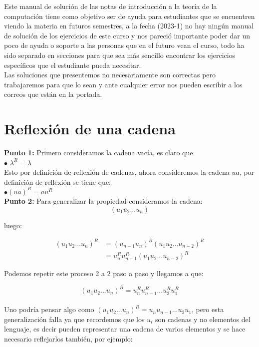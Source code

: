 Este manual de solución de las notas de introducción a la teoría de la computación tiene como objetivo ser de ayuda para estudiantes que se encuentren viendo la materia en futuros semestres, a la fecha (2023-1) no hay ningún manual de solución de los ejercicios de este curso y nos pareció importante poder dar un poco de ayuda o soporte a las personas que en el futuro vean el curso, todo ha sido separado en secciones para que sea más sencillo encontrar los ejercicios específicos que el estudiante pueda necesitar.\\

Las soluciones que presentemos no necesariamente son correctas pero trabajaremos para que lo sean y ante cualquier error nos pueden escribir a los correos que están en la portada.

\section{Reflexión de una cadena}

\textbf{Punto 1:} Primero consideramos la cadena vacía, es claro que \\

\quad $\bullet$ $\lambda^R=\lambda$\\

Esto por definición de reflexión de cadenas, ahora consideremos la cadena $ua$, por definición de reflexión se tiene que:\\

\quad $\bullet (ua)^R=au^R$\\

\textbf{Punto 2:} Para generalizar la propiedad consideramos la cadena:\\

$$(u_1u_2...u_n)$$

luego:

\begin{align*}
(u_1u_2...u_n)^R&=(u_{n-1}u_n)^R(u_1u_2...u_{n-2})^R\\
&=u_n^Ru_{n-1}^R(u_1u_2...u_{n-2})^R
\end{align*}


Podemos repetir este proceso 2 a 2 paso a paso y llegamos a que:

$$(u_1u_2...u_n)^R=u_n^Ru_{n-1}^R...u_2^Ru_1^R$$\\

Uno podría pensar algo como $(u_1u_2...u_n)^R=u_nu_{n-1}...u_2u_1$, pero esta generalización falla ya que recordemos que los $u_i$ son cadenas y no elementos del lenguaje, es decir pueden representar una cadena de varios elementos y se hace necesario reflejarlos también, por ejemplo:\\


